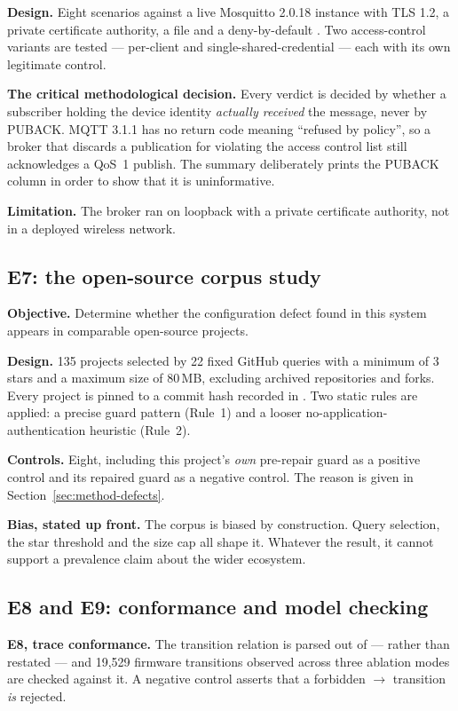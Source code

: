 \textbf{Design.} Eight scenarios against a live Mosquitto 2.0.18 instance with TLS 1.2, a
private certificate authority, a  file and a deny-by-default
. Two access-control variants are tested — per-client and single-shared-credential
— each with its own legitimate control.

\textbf{The critical methodological decision.} Every verdict is decided by whether a subscriber
holding the device identity \emph{actually received} the message, never by PUBACK. MQTT 3.1.1
has no return code meaning ``refused by policy'', so a broker that discards a publication for
violating the access control list still acknowledges a QoS~1 publish. The summary deliberately
prints the PUBACK column in order to show that it is uninformative.

\textbf{Limitation.} The broker ran on loopback with a private certificate authority, not in a
deployed wireless network.

\subsection{E7: the open-source corpus study}

\textbf{Objective.} Determine whether the configuration defect found in this system appears in
comparable open-source projects.

\textbf{Design.} 135 projects selected by 22 fixed GitHub queries with a minimum of 3 stars and
a maximum size of 80\,MB, excluding archived repositories and forks. Every project is pinned to
a commit hash recorded in . Two static rules are applied: a precise guard
pattern (Rule~1) and a looser no-application-authentication heuristic (Rule~2).

\textbf{Controls.} Eight, including this project's \emph{own} pre-repair guard as a positive
control and its repaired guard as a negative control. The reason is given in
Section~\ref{sec:method-defects}.

\textbf{Bias, stated up front.} The corpus is biased by construction. Query selection, the star
threshold and the size cap all shape it. Whatever the result, it cannot support a prevalence
claim about the wider ecosystem.

\subsection{E8 and E9: conformance and model checking}

\textbf{E8, trace conformance.} The transition relation is parsed out of
 — rather than restated — and 19,529 firmware transitions observed
across three ablation modes are checked against it. A negative control asserts that a forbidden
 $\rightarrow$  transition \emph{is} rejected.

